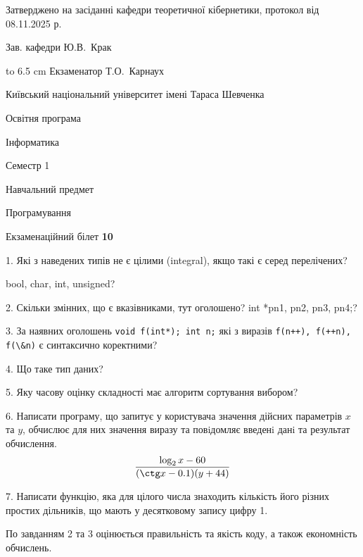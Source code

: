 \documentclass[12pt, ukrainian]{article}
\def\code#1{\Verb!#1!}
\begin{document}
{\smallskip\smallskip \begin {scriptsize} Затверджено на засіданні кафедри теоретичної кібернетики, протокол   від   08.11.2025 р.\par\smallskip\smallskip\smallskip\smallskip
{\parbox {6.5 cm} {Зав. кафедри \dotfill Ю.В.~Крак}}\hspace {0.7cm} {\hbox to 6.5 cm { Екзаменатор \dotfill Т.О.~Карнаух}} \end{scriptsize}}
\vspace{0.9cm}
{{\begin {scriptsize}\par
{ \center  Київський національний університет імені Тараса Шевченка \par}
{\parbox {5 cm}{Освітня програма \hfill}{\parbox {7 cm}{Інформатика\hfill}}\parbox {6 cm}{\hfill Семестр 1}}\par
{\parbox {5 cm} {Навчальний предмет \hfill}\parbox {7 cm}{Програмування \hfill}\parbox {6cm}{\hfill}\par}\vspace{-15pt} \end{scriptsize}}{\center Екзаменаційний білет \No \textbf { 10 }\par}}
{%
1. Які з наведених типів не є цілими (integral), якщо такі є серед перелічених?

bool, char, int, unsigned?
\par
\vspace{2mm}
2. Скільки змінних, що є вказівниками, тут оголошено?
int *pn1, pn2, pn3, pn4;?
\par
\vspace{2mm}
3. За наявних оголошень \code{void f(int*); int n;} які з виразів \code{f(n++), f(++n), f(\&n)} є синтаксично коректними?
\par
\vspace{2mm}
4. Що таке тип даних?
\par
\vspace{2mm}
5. Яку часову оцінку складності має алгоритм сортування вибором?
\par
\vspace{2mm}
6. Написати програму, що запитує у користувача значення дійсних параметрів $x$ та $y$, обчислює для них значення виразу та повiдомляє введенi данi та результат обчислення.
$$\frac{\log_{2} x - 60}{(\ctg x - 0.1) (y + 44)}$$ 

\par
7. Написати функцію, яка для цілого числа знаходить кількість його різних простих дільників, що мають у десятковому запису цифру 1.

По завданням 2 та 3 оцінюється правильність та якість коду, а також економність обчислень.

}
\end{document}
